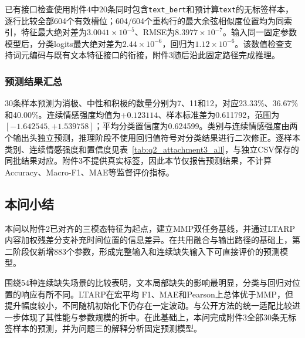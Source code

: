 \QTwoParagraph 已有接口检查使用附件4中20条同时包含\texttt{text\_bert}和预计算\texttt{text}的无标签样本，逐行比较全部604个有效槽位；604/604个重构行的最大余弦相似度位置均为同索引，特征最大绝对差为$3.0041\times10^{-5}$、RMSE为$8.3977\times10^{-7}$。输入同一固定参数模型后，分类logits最大绝对差为$2.44\times10^{-6}$，回归为$1.12\times10^{-6}$。该数值检查支持词元编码与既有文本特征接口的衔接，附件3随后沿此固定路径完成推理。

\subsubsection{预测结果汇总}
\QTwoParagraph 30条样本预测为消极、中性和积极的数量分别为7、11和12，对应23.33\%、36.67\%和40.00\%。连续情感强度均值为$+0.123114$、样本标准差为0.611792，范围为$[-1.642545,+1.539758]$；平均分类置信度为0.624599。类别与连续情感强度由两个输出头独立预测，推理阶段不使用回归值符号对分类结果进行二次修正。逐样本类别、连续情感强度和置信度见表~\ref{tab:q2_attachment3_all}，与独立CSV保存的同批结果对应。附件3不提供真实标签，因此本节仅报告预测结果，不计算Accuracy、Macro-F1、MAE等监督评价指标。


\subsection{本问小结}\label{subsec:q2_summary}
\QTwoParagraph 本问以附件2已对齐的三模态特征为起点，建立MMP双任务基线，并通过LTARP内容加权残差分支补充时间位置的信息差异。在共用融合与输出路径的基础上，第二阶段仅新增883个参数，形成完整输入和连续缺失输入下可直接评价的预测模型。

\QTwoParagraph 围绕54种连续缺失场景的比较表明，文本局部缺失的影响最明显，分类与回归对位置的响应有所不同。LTARP在宏平均 F1、MAE和Pearson上总体优于MMP，但提升幅度较小，不同随机初始化下仍存在一定波动。与公开方法的统一适配比较进一步体现了其性能与参数规模的折中。在此基础上，本问完成附件3全部30条无标签样本的预测，并为问题三的解释分析固定预测模型。
